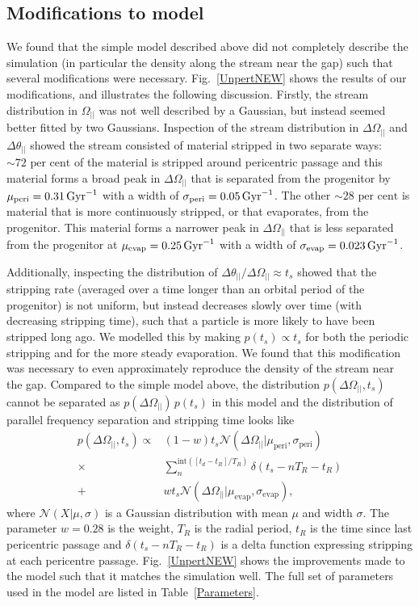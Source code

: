 \documentclass[useAMS,usenatbib,fleqn,a4paper]{mn2e}
\def\Gyr{\,{\rm Gyr}}
\def\percent{\text{ per cent}}
\def\percent{\text{ per cent}}
\begin{document}
\subsection{Modifications to model}\label{Sect::modelmods}
We found that the simple model described above did not completely describe the simulation (in particular the density along the stream near the gap) such that several modifications were necessary. Fig.~\ref{UnpertNEW} shows the results of our modifications, and illustrates the following discussion. Firstly, the stream distribution in $\Omega_{||}$ was not well described by a Gaussian, but instead seemed better fitted by two Gaussians. Inspection of the stream distribution in $\Delta\Omega_{||}$ and $\Delta\theta_{||}$ showed the stream consisted of material stripped in two separate ways: $\sim72\percent$ of the material is stripped around pericentric passage and this material forms a broad peak in $\Delta\Omega_{||}$ that is separated from the progenitor by $\mu_\mathrm{peri}=0.31\Gyr^{-1}$ with a width of $\sigma_\mathrm{peri}=0.05\Gyr^{-1}$. The other $\sim28\percent$ is material that is more continuously stripped, or that evaporates, from the progenitor. This material forms a narrower peak in $\Delta\Omega_{||}$ that is less separated from the progenitor at $\mu_\mathrm{evap}=0.25\Gyr^{-1}$ with a width of $\sigma_\mathrm{evap}=0.023\Gyr^{-1}$.

Additionally, inspecting the distribution of $\Delta\theta_{||}/\Delta\Omega_{||}\approx t_s$ showed that the stripping rate (averaged over a time longer than an orbital period of the progenitor) is not uniform, but instead decreases slowly over time (with decreasing stripping time), such that a particle is more likely to have been stripped long ago. We modelled this by making $p(t_s)\propto t_s$ for both the periodic stripping and for the more steady evaporation. We found that this modification was necessary to even approximately reproduce the density of the stream near the gap. Compared to the simple model above, the distribution $p(\Delta\Omega_{||},t_s)$ cannot be separated as $p(\Delta\Omega_{||})\,p(t_s)$ in this model and the distribution of parallel frequency separation and stripping time looks like
\begin{equation}
\begin{split}
p(\Delta\Omega_{||},t_s) \propto &(1-w)t_s\mathcal{N}(\Delta\Omega_{||}|\mu_\mathrm{peri},\sigma_\mathrm{peri})\\\times&\sum_n^{\mathrm{int}([t_d-t_R]/T_R)}\delta(t_s-nT_R-t_R)\\+&wt_s\mathcal{N}(\Delta\Omega_{||}|\mu_\mathrm{evap},\sigma_\mathrm{evap}),
\end{split}
\end{equation}
where $\mathcal{N}(X|\mu,\sigma)$ is a Gaussian distribution with mean $\mu$ and width $\sigma$. The parameter $w=0.28$ is the weight, $T_R$ is the radial period, $t_R$ is the time since last pericentric passage and $\delta(t_s-nT_R-t_R)$ is a delta function expressing stripping at each pericentre passage. Fig.~\ref{UnpertNEW} shows the improvements made to the model such that it matches the simulation well. The full set of parameters used in the model are listed in Table~\ref{Parameters}.
\end{document}
